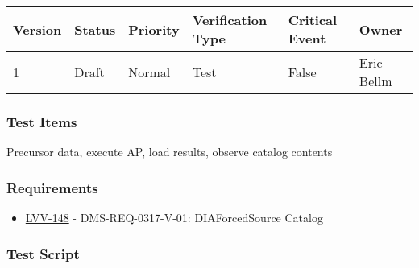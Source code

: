 \begin{longtable}[]{@{}llllll@{}}
\toprule
Version & Status & Priority & Verification Type & Critical Event &
Owner\tabularnewline
\midrule
\endhead
1 & Draft & Normal & Test & False & Eric Bellm\tabularnewline
\bottomrule
\end{longtable}

\hypertarget{test-items-144}{%
\subsubsection{Test Items}\label{test-items-144}}

Precursor data, execute AP, load results, observe catalog contents

\hypertarget{requirements-145}{%
\subsubsection{Requirements}\label{requirements-145}}

\begin{itemize}
\tightlist
\item
  \href{https://jira.lsstcorp.org/browse/LVV-148}{LVV-148} -
  DMS-REQ-0317-V-01: DIAForcedSource Catalog
\end{itemize}

\hypertarget{test-script-145}{%
\subsubsection{Test Script}\label{test-script-145}}


